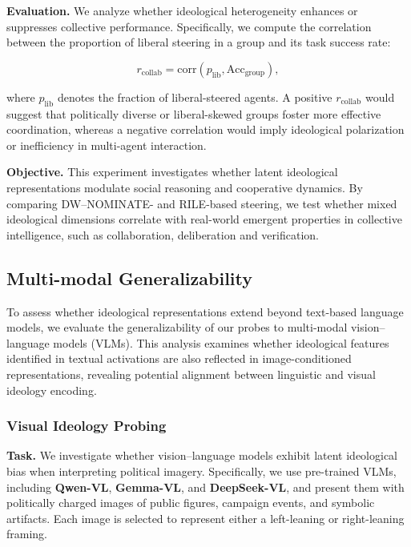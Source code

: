 \documentclass[11pt]{article}
\begin{document}
\textbf{Evaluation.} We analyze whether ideological heterogeneity enhances or suppresses collective performance. Specifically, we compute the correlation between the proportion of liberal steering in a group and its task success rate:


\begin{equation*}
    r_{\text{collab}} = \mathrm{corr}\!\left(p_{\text{lib}}, \text{Acc}_{\text{group}}\right),
\end{equation*}

where $p_{\text{lib}}$ denotes the fraction of liberal-steered agents. A positive $r_{\text{collab}}$ would suggest that politically diverse or liberal-skewed groups foster more effective coordination, whereas a negative correlation would imply ideological polarization or inefficiency in multi-agent interaction.

\textbf{Objective.} This experiment investigates whether latent ideological representations modulate social reasoning and cooperative dynamics. By comparing DW--NOMINATE- and RILE-based steering, we test whether mixed ideological dimensions correlate with real-world emergent properties in collective intelligence, such as collaboration, deliberation and verification.

\subsection{Multi-modal Generalizability}

To assess whether ideological representations extend beyond text-based language models, we evaluate the generalizability of our probes to multi-modal vision--language models (VLMs). This analysis examines whether ideological features identified in textual activations are also reflected in image-conditioned representations, revealing potential alignment between linguistic and visual ideology encoding.

\subsubsection{Visual Ideology Probing}

\textbf{Task.} We investigate whether vision--language models exhibit latent ideological bias when interpreting political imagery. Specifically, we use pre-trained VLMs, including \textbf{Qwen-VL}, \textbf{Gemma-VL}, and \textbf{DeepSeek-VL}, and present them with politically charged images of public figures, campaign events, and symbolic artifacts. Each image is selected to represent either a left-leaning or right-leaning framing.
\end{document}
